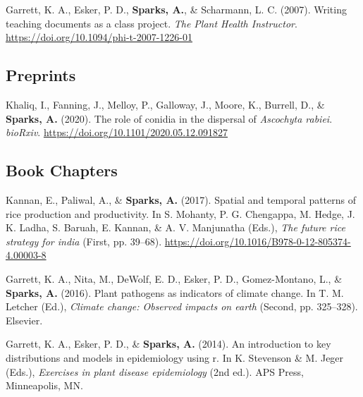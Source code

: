 \documentclass[11pt, a4paper]{awesome-cv}
\begin{document}
\leavevmode\hypertarget{ref-Garrett2007a}{}%
Garrett, K. A., Esker, P. D., \textbf{Sparks, A.}, \& Scharmann, L. C.
(2007). Writing teaching documents as a class project. \emph{The Plant
Health Instructor}. \url{https://doi.org/10.1094/phi-t-2007-1226-01}

\endgroup

\hypertarget{preprints}{%
\subsection{Preprints}\label{preprints}}

\begingroup
\setlength{\parindent}{-0.5in}
\setlength{\leftskip}{0.5in}

\hypertarget{refs_preprints}{}
\leavevmode\hypertarget{ref-Khaliq2020}{}%
Khaliq, I., Fanning, J., Melloy, P., Galloway, J., Moore, K., Burrell,
D., \& \textbf{Sparks, A.} (2020). The role of conidia in the dispersal
of \emph{{Ascochyta} rabiei}. \emph{bioRxiv}.
\url{https://doi.org/10.1101/2020.05.12.091827}

\endgroup

\hypertarget{book-chapters}{%
\subsection{Book Chapters}\label{book-chapters}}

\begingroup
\setlength{\parindent}{-0.5in}
\setlength{\leftskip}{0.5in}

\hypertarget{refs_books}{}
\leavevmode\hypertarget{ref-Kannan2017}{}%
Kannan, E., Paliwal, A., \& \textbf{Sparks, A.} (2017). Spatial and
temporal patterns of rice production and productivity. In S. Mohanty, P.
G. Chengappa, M. Hedge, J. K. Ladha, S. Baruah, E. Kannan, \& A. V.
Manjunatha (Eds.), \emph{The future rice strategy for india} (First, pp.
39--68). \url{https://doi.org/10.1016/B978-0-12-805374-4.00003-8}

\leavevmode\hypertarget{ref-Garrett2016}{}%
Garrett, K. A., Nita, M., DeWolf, E. D., Esker, P. D., Gomez-Montano,
L., \& \textbf{Sparks, A.} (2016). Plant pathogens as indicators of
climate change. In T. M. Letcher (Ed.), \emph{Climate change: Observed
impacts on earth} (Second, pp. 325--328). Elsevier.

\leavevmode\hypertarget{ref-Garrett2014}{}%
Garrett, K. A., Esker, P. D., \& \textbf{Sparks, A.} (2014). An
introduction to key distributions and models in epidemiology using r. In
K. Stevenson \& M. Jeger (Eds.), \emph{Exercises in plant disease
epidemiology} (2nd ed.). APS Press, Minneapolis, MN.
\end{document}
